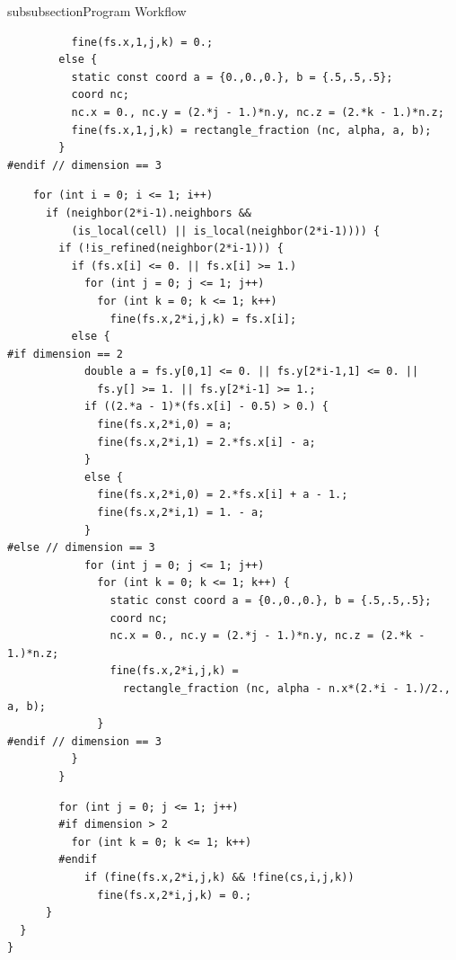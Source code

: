 \begin{codesection}{subsubsection}{Program Workflow}
\begin{verbatim}
          fine(fs.x,1,j,k) = 0.;
        else {
          static const coord a = {0.,0.,0.}, b = {.5,.5,.5};
          coord nc;
          nc.x = 0., nc.y = (2.*j - 1.)*n.y, nc.z = (2.*k - 1.)*n.z;
          fine(fs.x,1,j,k) = rectangle_fraction (nc, alpha, a, b);
        }
#endif // dimension == 3
\end{verbatim}
\codearrow
{}
\begin{verbatim}
    for (int i = 0; i <= 1; i++)
      if (neighbor(2*i-1).neighbors &&
          (is_local(cell) || is_local(neighbor(2*i-1)))) {
        if (!is_refined(neighbor(2*i-1))) {
          if (fs.x[i] <= 0. || fs.x[i] >= 1.)
            for (int j = 0; j <= 1; j++)
              for (int k = 0; k <= 1; k++)
                fine(fs.x,2*i,j,k) = fs.x[i];
          else {
#if dimension == 2
            double a = fs.y[0,1] <= 0. || fs.y[2*i-1,1] <= 0. ||
              fs.y[] >= 1. || fs.y[2*i-1] >= 1.;
            if ((2.*a - 1)*(fs.x[i] - 0.5) > 0.) {
              fine(fs.x,2*i,0) = a;
              fine(fs.x,2*i,1) = 2.*fs.x[i] - a;
            }
            else {
              fine(fs.x,2*i,0) = 2.*fs.x[i] + a - 1.;
              fine(fs.x,2*i,1) = 1. - a;
            }
#else // dimension == 3
            for (int j = 0; j <= 1; j++)
              for (int k = 0; k <= 1; k++) {
                static const coord a = {0.,0.,0.}, b = {.5,.5,.5};
                coord nc;
                nc.x = 0., nc.y = (2.*j - 1.)*n.y, nc.z = (2.*k - 1.)*n.z;
                fine(fs.x,2*i,j,k) =
                  rectangle_fraction (nc, alpha - n.x*(2.*i - 1.)/2., a, b);
              }
#endif // dimension == 3
          }
        }
\end{verbatim}
\codearrow
{}
\begin{verbatim}
        for (int j = 0; j <= 1; j++)
        #if dimension > 2
          for (int k = 0; k <= 1; k++)
        #endif
            if (fine(fs.x,2*i,j,k) && !fine(cs,i,j,k))
              fine(fs.x,2*i,j,k) = 0.;
      }
  }
}
\end{verbatim}
\end{codesection}
\printbibliography
